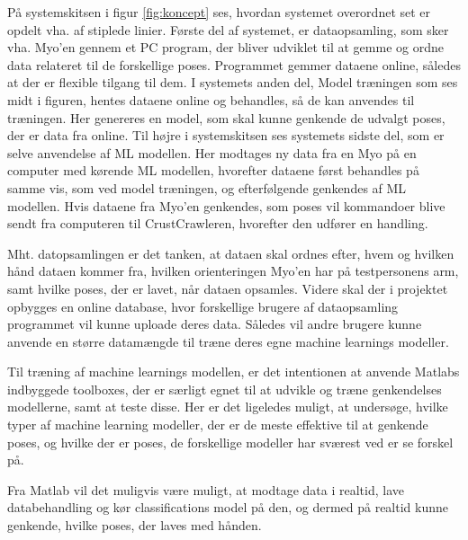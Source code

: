 
På systemskitsen i figur \ref{fig:koncept} ses, hvordan systemet overordnet set er opdelt vha. af stiplede linier. Første del af systemet, er dataopsamling, som sker vha. Myo’en gennem et PC program, der bliver udviklet til at gemme og ordne data relateret til de forskellige poses. Programmet gemmer dataene online, således at der er flexible tilgang til dem.
 I systemets anden del, Model træningen som ses midt i figuren, hentes dataene online og behandles, så de kan anvendes til træningen. Her genereres en model, som skal kunne genkende de udvalgt poses, der er data fra online. 
 Til højre i systemskitsen ses systemets sidste del, som er selve anvendelse af ML modellen. Her modtages ny data fra en Myo på en computer med kørende ML modellen, hvorefter dataene først behandles på samme vis, som ved model træningen, og efterfølgende genkendes af ML modellen. Hvis dataene fra Myo’en genkendes, som poses vil kommandoer blive sendt fra computeren til CrustCrawleren, hvorefter den udfører en handling.  

Mht. datopsamlingen er det tanken, at dataen skal ordnes efter, hvem og hvilken hånd dataen kommer fra, hvilken orienteringen Myo’en har på testpersonens arm, samt hvilke poses, der er lavet, når dataen opsamles. Videre skal der i projektet opbygges en online database, hvor forskellige brugere af dataopsamling programmet vil kunne uploade deres data. Således vil andre brugere kunne anvende en større datamængde til træne deres egne machine learnings modeller.

Til træning af machine learnings modellen, er det intentionen at anvende Matlabs indbyggede toolboxes, der er særligt egnet til at udvikle og træne genkendelses modellerne, samt at teste disse. 
Her er det ligeledes muligt, at undersøge, hvilke typer af machine learning modeller, der er de meste effektive til at genkende poses, og hvilke der er poses, de forskellige modeller har sværest ved er se forskel på. 

Fra Matlab vil det muligvis være muligt, at modtage data i realtid, lave databehandling og kør classifications model på den, og dermed på realtid kunne genkende, hvilke poses, der laves med hånden.
